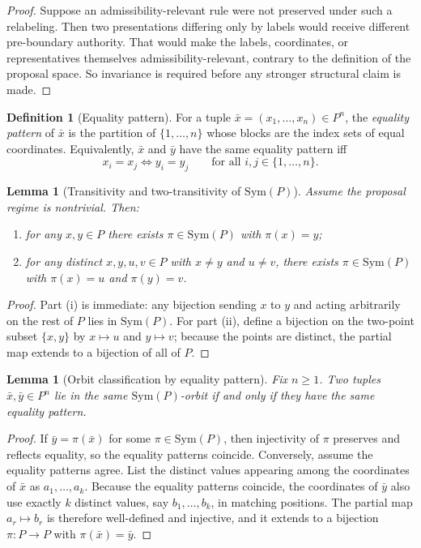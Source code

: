\documentclass[11pt]{article}
\theoremstyle{plain}
\newtheorem{lemma}[theorem]{Lemma}
\theoremstyle{definition}
\newtheorem{definition}[theorem]{Definition}
\begin{document}
\begin{proof}
Suppose an admissibility-relevant rule were not preserved under such a relabeling. Then two presentations differing only by labels would receive different pre-boundary authority. That would make the labels, coordinates, or representatives themselves admissibility-relevant, contrary to the definition of the proposal space. So invariance is required before any stronger structural claim is made.
\end{proof}

\begin{definition}[Equality pattern]
For a tuple $\bar x=(x_1,\dots,x_n)\in P^n$, the \emph{equality pattern} of $\bar x$ is the partition of $\{1,\dots,n\}$ whose blocks are the index sets of equal coordinates. Equivalently, $\bar x$ and $\bar y$ have the same equality pattern iff
\[
x_i=x_j \Longleftrightarrow y_i=y_j \qquad \text{for all } i,j\in\{1,\dots,n\}.
\]
\end{definition}

\begin{lemma}[Transitivity and two-transitivity of $\mathrm{Sym}(P)$]
\label{lem:B-two-transitive}
Assume the proposal regime is nontrivial. Then:
\begin{enumerate}[label=(\roman*), leftmargin=2.5em]
    \item for any $x,y\in P$ there exists $\pi\in\mathrm{Sym}(P)$ with $\pi(x)=y$;
    \item for any distinct $x,y,u,v\in P$ with $x\neq y$ and $u\neq v$, there exists $\pi\in\mathrm{Sym}(P)$ with $\pi(x)=u$ and $\pi(y)=v$.
\end{enumerate}
\end{lemma}

\begin{proof}
Part (i) is immediate: any bijection sending $x$ to $y$ and acting arbitrarily on the rest of $P$ lies in $\mathrm{Sym}(P)$. For part (ii), define a bijection on the two-point subset $\{x,y\}$ by $x\mapsto u$ and $y\mapsto v$; because the points are distinct, the partial map extends to a bijection of all of $P$.
\end{proof}

\begin{lemma}[Orbit classification by equality pattern]
\label{lem:B-orbits}
Fix $n\ge 1$. Two tuples $\bar x,\bar y\in P^n$ lie in the same $\mathrm{Sym}(P)$-orbit if and only if they have the same equality pattern.
\end{lemma}

\begin{proof}
If $\bar y=\pi(\bar x)$ for some $\pi\in\mathrm{Sym}(P)$, then injectivity of $\pi$ preserves and reflects equality, so the equality patterns coincide. Conversely, assume the equality patterns agree. List the distinct values appearing among the coordinates of $\bar x$ as $a_1,\dots,a_k$. Because the equality patterns coincide, the coordinates of $\bar y$ also use exactly $k$ distinct values, say $b_1,\dots,b_k$, in matching positions. The partial map $a_r\mapsto b_r$ is therefore well-defined and injective, and it extends to a bijection $\pi:P\to P$ with $\pi(\bar x)=\bar y$.
\end{proof}
\end{document}
